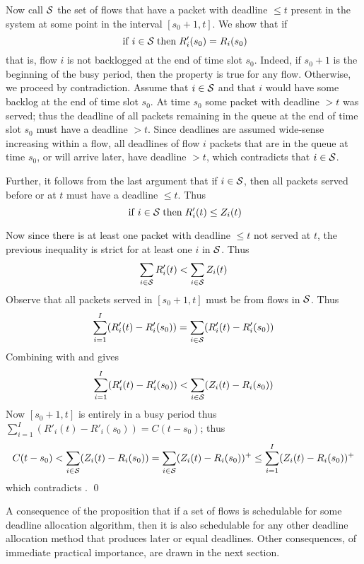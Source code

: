 Now call $\mathcal S$ the set of flows that have a packet with deadline
$\leq t$ present in the system at some point in the interval
$[s_0+1, t]$. We show that if
\begin{equation}\mylabel{eq-proof-edf-2}
  \mif i \in \calS
  \mthen
  R'_i(s_0)=R_i(s_0)
\end{equation}
that is, flow $i$ is not backlogged at the end of time slot $s_0$.
Indeed, if $s_0+1$ is the beginning of the busy period, then the
property is true for any flow. Otherwise, we proceed by
contradiction. Assume that $i\in \mathcal S$ and that $i$ would have
some backlog at the end of time slot $s_0$. At time $s_0$ some
packet with deadline $>t$ was served; thus the deadline of all
packets remaining in the queue at the end of time slot $s_0$ must
have a deadline $>t$. Since deadlines are assumed wide-sense
increasing within a flow, all deadlines of flow $i$ packets that
are in the queue at time $s_0$, or will arrive later, have
deadline $>t$, which contradicts that $i \in \mathcal S$.

Further, it follows from the last argument that if $i \in \mathcal S$,
then all packets served before or at $t$ must have a deadline
$\leq t$. Thus
 $$
 \mathrm{\; if \; } i \in \mathcal S \mathrm{\; then \; } R'_i(t) \leq Z_i(t)
 $$

Now since there is at least one packet with deadline $\leq t$ not
served at $t$, the previous inequality is strict for at least one
$i$ in $\mathcal S$. Thus
\begin{equation}\mylabel{eq-proof-edf-1}
  \sum_{i \in \calS} R'_i(t) < \sum_{i \in \calS} Z_i(t)
\end{equation}
Observe that all packets served in $[s_0+1, t]$ must be from flows
in $\mathcal S$. Thus
 $$
 \sum_{i=1}^I (R'_i(t)-R'_i(s_0)) = \sum_{i \in \mathcal S}(R'_i(t)-R'_i(s_0))
 $$
Combining with  and 
gives
 $$
\sum_{i=1}^I (R'_i(t)-R'_i(s_0)) < \sum_{i \in
\mathcal S}(Z_i(t)-R_i(s_0))
$$
Now $[s_0+1, t]$ is entirely in a busy period thus $\sum_{i=1}^I
(R'_i(t)-R'_i(s_0))=C(t-s_0)$; thus
 $$
C(t-s_0) < \sum_{i \in \mathcal S}(Z_i(t)-R_i(s_0)) = \sum_{i \in
\mathcal S}(Z_i(t)-R_i(s_0))^+ \leq \sum_{i=1}^{I}(Z_i(t)-R_i(s_0))^+
 $$
 which contradicts .
 \qed

A consequence of the proposition that if a set of flows is
schedulable for some deadline allocation algorithm, then it is
also schedulable for any other deadline allocation method that
produces later or equal deadlines. Other consequences, of
immediate practical importance, are drawn in the next section.

